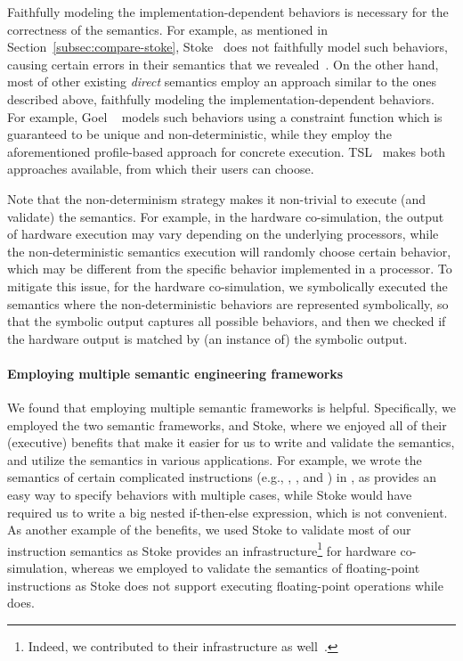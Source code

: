 Faithfully modeling the implementation-dependent behaviors is necessary for the correctness of the semantics.
For example, as mentioned in Section~\ref{subsec:compare-stoke}, Stoke~\cite{Stoke2013} does not faithfully model such behaviors, causing certain errors in their semantics that we revealed~\cite{BugStoke986}.
On the other hand, most of other existing \emph{direct} \ISA semantics employ an approach similar to the ones described above, faithfully modeling the implementation-dependent behaviors.
For example, Goel \etal~\cite{Goel:ProCoS17} models such behaviors using a constraint function which is guaranteed to be unique and non-deterministic, while they employ the aforementioned profile-based approach for concrete execution.
TSL~\cite{TSL:TOPLAS13} makes both approaches available, from which their users can choose.

Note that the non-determinism strategy makes it non-trivial to execute (and validate) the semantics.
For example, in the hardware co-simulation, the output of hardware execution may vary depending on the underlying processors, while the non-deterministic semantics execution will randomly choose certain behavior, which may be different from the specific behavior implemented in a processor.
To mitigate this issue, for the hardware co-simulation, we symbolically executed the semantics where the non-deterministic behaviors are represented symbolically, so that the symbolic output captures all possible behaviors, and then we checked if the hardware output is matched by (an instance of) the symbolic output.

\paragraph{Employing multiple semantic engineering frameworks}

We found that employing multiple semantic frameworks is helpful. Specifically, we employed the two semantic frameworks, \K and Stoke, where we enjoyed all of their (executive) benefits that make it easier for us to write and validate the semantics, and utilize the semantics in various applications. For example, we wrote the semantics of certain complicated instructions (e.g., , , and ) in \K, as \K provides an easy way to specify behaviors with multiple cases, while Stoke would have required us to write a big nested if-then-else expression, which is not convenient. As another example of the benefits, we used Stoke to validate most of our instruction semantics
as Stoke provides an infrastructure\footnote{Indeed, we contributed to their infrastructure as well~\cite{completing-stock,improving-stoke}.} for hardware co-simulation, whereas we employed \K to validate the semantics of floating-point instructions as Stoke does not support executing floating-point operations while \K does.


